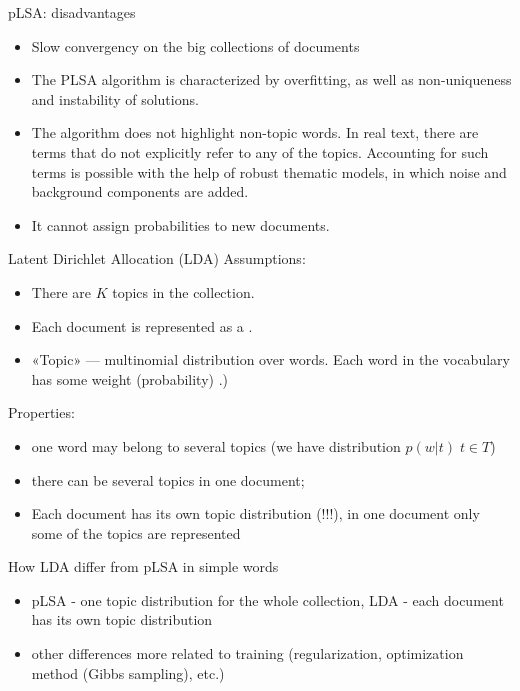 \documentclass[svgnames]{beamer}
\begin{document}
    \begin{frame}{pLSA: disadvantages}
        \begin{itemize}
            \item Slow convergency on the big collections of documents
            \item The PLSA algorithm is characterized by overfitting, as well as non-uniqueness and instability of solutions.
            \item The algorithm does not highlight non-topic words.
            In real text, there are terms that do not explicitly refer to any of the topics.
            Accounting for such terms is possible with the help of robust thematic models, in which noise and background components are added.
            \item It cannot assign probabilities to new documents.
        \end{itemize}
    \end{frame}

    \begin{frame}{Latent Dirichlet Allocation (LDA)}
        Assumptions:
        \begin{itemize}
            \item There are $K$ topics in the collection.
            \item Each document is represented as a .
            \item «Topic» — multinomial distribution over words. Each word in the vocabulary
            has some weight (probability) .)
        \end{itemize}

        Properties:
        \begin{itemize}
            \item one word may belong to several topics (we have distribution $p(w|t) \; t\in T$)
            \item there can be several topics in one document;
            \item Each document has its own topic distribution (!!!), in one document only some of the topics are represented
        \end{itemize}
    \end{frame}

    \begin{frame}{How LDA differ from pLSA in simple words}
        \begin{itemize}
            \item pLSA - one topic distribution for the whole collection, LDA - each document has its own topic distribution
            \item other differences more related to training (regularization, optimization method (Gibbs sampling), etc.)
        \end{itemize}
    \end{frame}
\end{document}
